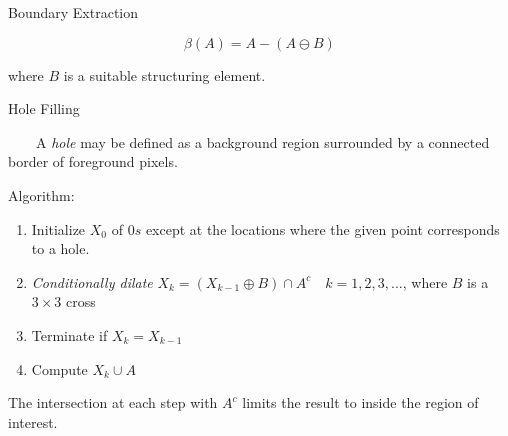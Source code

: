 \documentclass[]{article}
\begin{document}
Boundary Extraction

\[\beta(A)=A-(A\ominus B)\]

where \(B\) is a suitable structuring element.

Hole Filling

\(\quad\quad\)A \emph{hole} may be defined as a background region
surrounded by a connected border of foreground pixels.

Algorithm: \\

\begin{enumerate}
\def\labelenumi{\arabic{enumi}.}
\item
  Initialize \(X_0\) of \(0s\) except at the locations where the given
  point corresponds to a hole.
\item
  \emph{Conditionally dilate}
  \(X_k=(X_{k-1}\oplus B)\cap A^c \quad k=1,2,3,...\), where \(B\) is a
  \(3\times 3\) cross
\item
  Terminate if \(X_k=X_{k-1}\) 
\item
  Compute \(X_k\cup A\)
\end{enumerate}

The intersection at each step with \(A^c\) limits the result to inside
the region of interest.
\end{document}
